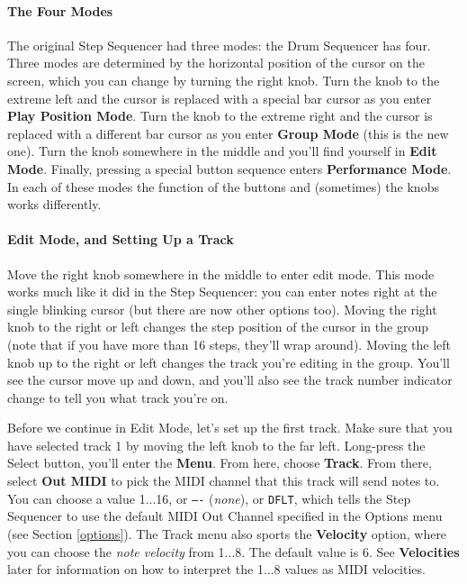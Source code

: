 \documentclass{article}
\begin{document}
\paragraph{The Four Modes} The original Step Sequencer had three modes: the Drum Sequencer has four. Three modes are determined by the horizontal position of the cursor on the screen, which you can change by turning the right knob.  Turn the knob to the extreme left and the cursor is replaced with a special bar cursor as you enter {\bf Play Position Mode}.  Turn the knob to the extreme right and the cursor is replaced with a different bar cursor as you enter {\bf Group Mode} (this is the new one).  Turn the knob somewhere in the middle and you'll find yourself in {\bf Edit Mode}.  Finally, pressing a special button sequence enters {\bf Performance Mode}.  In each of these modes the function of the buttons and (sometimes) the knobs works differently. 

\paragraph{Edit Mode, and Setting Up a Track} Move the right knob somewhere in the middle to enter edit mode.  This mode works much like it did in the Step Sequencer: you can enter notes right at the single blinking cursor (but there are now other options too).  Moving the right knob to the right or left changes the step position of the cursor in the group (note that if you have more than 16 steps, they'll wrap around).  Moving the left knob up to the right or left changes the track you're editing in the group.  You'll see the cursor move up and down, and you'll also see the track number indicator change to tell you what track you're on.

Before we continue in Edit Mode, let's set up the first track.  Make sure that you have selected track 1 by moving the left knob to the far left.  Long-press the Select button, you'll enter the {\bf Menu}.  From here, choose {\bf Track}.  From there, select {\bf Out MIDI} to pick the MIDI channel that this track will send notes to.  You can choose a value 1...16, or \texttt{----} ({\it none}), or \texttt{DFLT}, which tells the Step Sequencer to use the default MIDI Out Channel specified in the Options menu (see Section \ref{options}).  The Track menu also sports the {\bf Velocity} option, where you can choose the {\it note velocity} from 1...8.  The default value is 6.  See {\bf Velocities} later for information on how to interpret the 1...8 values as MIDI velocities.  
\end{document}
